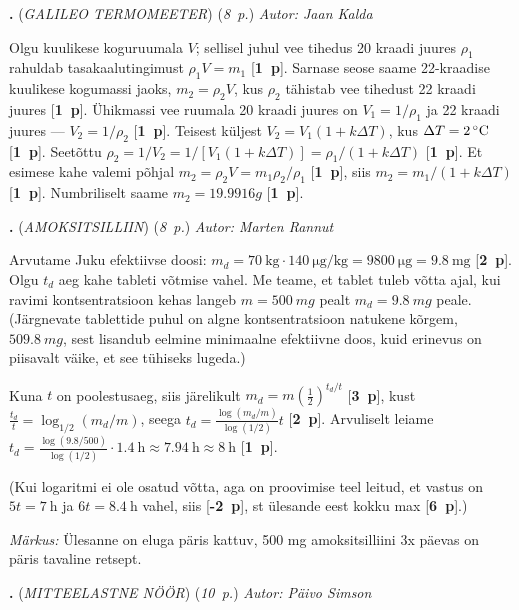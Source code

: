 \documentclass[11pt,a5paper]{article}
\newcommand{\numb}[1]{\vspace{5pt}\textbf{\large #1}}
\newcommand{\nimi}[1]{(\textsl{\small #1})}
\newcommand{\punktid}[1]{(\emph{#1~p.})}
\newcommand{\p}[1]{[\textbf{#1~p}]}
\newcounter{ylesanne}
\newcommand{\yl}[1]{\addtocounter{ylesanne}{1}\numb{\theylesanne.} \nimi{#1} \newblock{}}
\newcommand{\autor}[1]{\emph{Autor: #1}}%
\begin{document}
\yl{GALILEO TERMOMEETER}
\punktid{8} \autor{Jaan Kalda}

Olgu kuulikese koguruumala $V$; sellisel juhul vee tihedus 20 kraadi juures $\rho_1$ rahuldab tasakaalutingimust $\rho_1V=m_1$ \p{1}. Sarnase seose saame 22-kraadise kuulikese kogumassi jaoks, $m_2=\rho_2V$, kus  $\rho_2$ tähistab vee tihedust 22 kraadi juures \p{1}. Ühikmassi vee ruumala 20 kraadi juures on $V_1=1/\rho_1$ ja 22 kraadi juures ---  $V_2=1/\rho_2$ \p{1}. Teisest küljest $V_2=V_1(1+k\Delta T)$, kus $\Delta T=\SI 2\celsius$ \p{1}. Seetõttu $\rho_2=1/V_2=1/[V_1(1+k\Delta T)]=\rho_1/(1+k\Delta T)$ \p{1}. Et  esimese kahe valemi põhjal $m_2=\rho_2V=m_1\rho_2/\rho_1$ \p{1}, siis  $m_2=m_1/(1 + k\Delta T) $ \p{1}. Numbriliselt saame $m_2= \SI{19.9916}g$ \p{1}. 

\newpage
\yl{AMOKSITSILLIIN}
\punktid{8} \autor{Marten Rannut}

Arvutame Juku efektiivse doosi: $m_d = \SI{70}{\kilogram} \cdot \SI{140}{\micro\gram\per\kilogram} = \SI{9800}{\micro\gram} = \SI{9,8}{\milli\gram}$ \p{2}. Olgu $t_d$ aeg kahe tableti võtmise vahel. Me teame, et tablet tuleb võtta ajal, kui ravimi kontsentratsioon kehas langeb $m = \SI{500}{mg}$ pealt $m_d = \SI{9.8}{mg}$ peale. (Järgnevate tablettide puhul on algne kontsentratsioon natukene kõrgem, $\SI{509.8}{mg}$, sest lisandub eelmine minimaalne efektiivne doos, kuid erinevus on piisavalt väike, et see tühiseks lugeda.)

Kuna $t$ on poolestusaeg, siis järelikult $m_d = m(\frac 12)^{t_d/t}$ \p{3}, kust 
$\frac{t_d}{t} = \log_{1/2}(m_d/m)$, seega $t_d = \frac{\log(m_d/m)}{\log(1/2)}t$ \p{2}. Arvuliselt leiame $t_d = \frac{\log(9.8/500)}{\log(1/2)}\cdot \SI{1.4}{\hour} \approx \SI{7.94}{\hour} \approx \SI{8}{\hour}$ \p{1}.

(Kui logaritmi ei ole osatud võtta, aga on proovimise teel leitud, et vastus on $5t = \SI{7}{\hour}$ ja $6t=\SI{8.4}{\hour}$ vahel, siis \p{-2}, st ülesande eest kokku max \p{6}.)

\textit{Märkus:} Ülesanne on eluga päris kattuv, 500 mg amoksitsilliini 3x päevas on päris tavaline retsept.

\yl{MITTEELASTNE NÖÖR}
\punktid{10} \autor{Päivo Simson}
\end{document}
